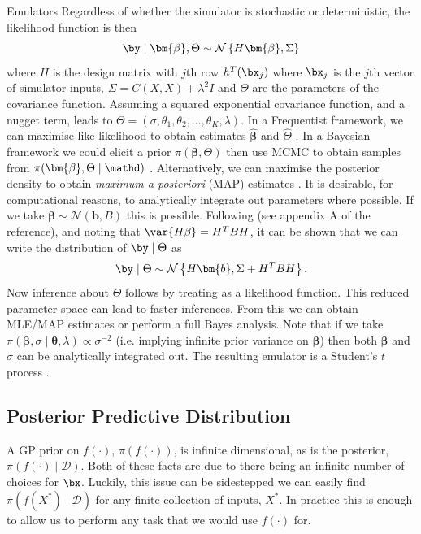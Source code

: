 \begin{chapter}{Emulators \label{Ch:Emulators}}
Regardless of whether the simulator is stochastic or deterministic, the likelihood function is then
\begin{equation}
  \by \mid \bm{\beta}, \Theta \sim \mathcal{N} \left\{ H\bm{\beta}, \Sigma\right\}
\end{equation} where $H$ is the design matrix with $j$th row $h^T(\bx_j)$ where $\bx_j$ is the $j$th vector of simulator inputs, $\Sigma = C(X, X) + \lambda^2 I$ and $\Theta$ are the parameters of the covariance function. Assuming a squared exponential covariance function, and a nugget term, leads to $\Theta = (\sigma, \theta_1, \theta_2, \ldots, \theta_K, \lambda)$.  In a Frequentist framework, we can maximise like likelihood to obtain estimates $\hat{\bm{\beta}}$ and $\hat{\Theta}$ \citep{Sacks89}. In a Bayesian framework we could elicit a prior $\pi(\bm{\beta}, \Theta)$ then use MCMC to obtain samples from $\pi(\bm{\beta}, \Theta \mid \mathd)$ \citep{Svalova2021}. Alternatively,  we can maximise the posterior density to obtain \textit{maximum a posteriori} (MAP) estimates \citep{Baker2020a}. It is desirable, for computational reasons, to analytically integrate out parameters where possible. If we take $\bm{\beta} \sim \mathcal{N}(\bm{b}, B)$ this is possible. Following \citet{BDA3} (see appendix A of the reference), and noting that $\var\{H\beta\} = H^T B H$, it can be shown that we can write the distribution of $\by \mid \Theta$ as
\begin{equation}
  \by \mid \Theta \sim \mathcal{N} \left\{ H \bm{b}, \Sigma + H^T B H\right\}. \label{Eq:int-mean}
\end{equation}
   Now inference about $\Theta$ follows by treating  as a likelihood function. This reduced parameter space can lead to faster inferences. From this we can obtain MLE/MAP estimates or perform a full Bayes analysis. Note that if we take $\pi(\bm{\beta}, \sigma \mid \bm{\theta}, \lambda) \propto \sigma^{-2}$ (i.e. implying infinite prior variance on $\bm{\beta}$) then both $\bm{\beta}$ and $\sigma$ can be analytically integrated out. The resulting emulator is a Student's $t$ process \citep{Oakley2002a}.
\subsection{Posterior Predictive Distribution}
A GP prior on $f(\cdot)$, $\pi(f(\cdot))$, is infinite dimensional, as is the posterior, $\pi(f(\cdot) \mid \mathcal{D})$. Both of these facts are due to there being an infinite number of choices for $\bx$. Luckily, this issue can be sidestepped we can easily find $\pi(f(X^*) \mid \mathcal{D})$ for any finite collection of inputs, $X^*$. In practice this is enough to allow us to perform any task that we would use $f(\cdot)$ for.


\end{chapter}
